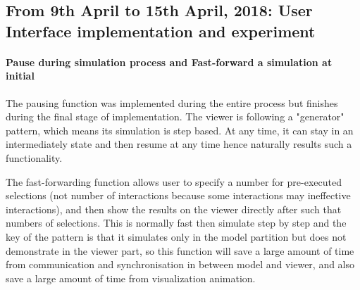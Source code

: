 \subsection{From 9th April to 15th April, 2018: User Interface implementation and experiment}
\paragraph{Pause during simulation process and Fast-forward a simulation at initial}
The pausing function was implemented during the entire process but finishes during the final stage of implementation.
The viewer is following a "generator" pattern, which means its simulation is step based. At any time, it can stay in an intermediately
state and then resume at any time hence naturally results such a functionality.
\par\noindent
The fast-forwarding function allows user to specify a number for pre-executed selections (not number of interactions because some interactions may ineffective interactions),
and then show the results on the viewer directly after such that numbers of selections. This is normally fast then simulate step by step and the key of the pattern is that
it simulates only in the model partition but does not demonstrate in the viewer part, so this function will save a large amount of time from communication and synchronisation in between
model and viewer, and also save a large amount of time from visualization animation.
